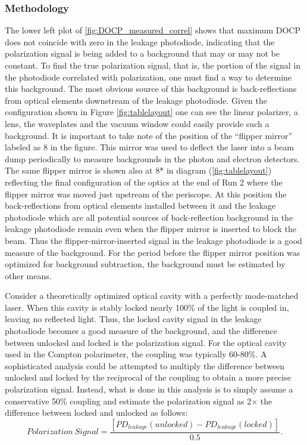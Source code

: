 \subsubsection{Methodology}
The lower left plot of \ref{fig:DOCP_measured_correl} shows that maximum DOCP does not coincide with zero in the leakage photodiode, indicating that the polarization signal is being added to a background that may or may not be constant. To find the true polarization signal, that is, the portion of the signal in the photodiode correlated with polarization, one must find a way to determine this background. The most obvious source of this background is back-reflections from optical elements downstream of the leakage photodiode. Given the configuration shown in Figure \ref{fig:tablelayout} one can see the linear polarizer, a lens, the waveplates and the vacuum window could easily provide such a background. It is important to take note of the position of the ``flipper mirror'' labeled as 8 in the figure. This mirror was used to deflect the laser into a beam dump periodically to measure backgrounds in the photon and electron detectors. The same flipper mirror is shown also at 8* in diagram (\ref{fig:tablelayout}) reflecting the final configuration of the optics at the end of Run 2 where the flipper mirror was moved just upstream of the periscope. At this position the back-reflections from optical elements installed between it and the leakage photodiode which are all potential sources of back-reflection background in the leakage photodiode remain even when the flipper mirror is inserted to block the beam. Thus the flipper-mirror-inserted signal in the leakage photodiode is a good measure of the background. For the period before the flipper mirror position was optimized for background subtraction, the background must be estimated by other means.

Consider a theoretically optimized optical cavity with a perfectly mode-matched laser. When this cavity is stably locked nearly 100\% of the light is coupled in, leaving no reflected light. Thus, the locked cavity signal in the leakage photodiode becomes a good measure of the background, and the difference between unlocked and locked is the polarization signal. For the optical cavity used in the Compton polarimeter, the coupling was typically 60-80\%. A sophisticated analysis could be attempted to multiply the difference between unlocked and locked by the reciprocal of the coupling to obtain a more precise polarization signal. Instead, what is done in this analysis is to simply assume a conservative 50\% coupling and estimate the polarization signal as 2$\times$ the difference between locked and unlocked as follows:
\begin{equation}
Polarization~Signal = \frac{\left[PD_{leakage}(unlocked)-PD_{leakage}(locked)\right]}{0.5}.
\label{eq:pol_sig}
\end{equation}


